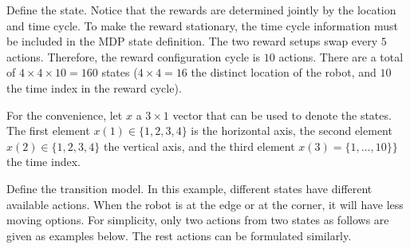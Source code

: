 Define the state. Notice that the rewards are determined jointly by the location and time cycle. To make the reward stationary, the time cycle information must be included in the MDP state definition. The two reward setups swap every $5$ actions. Therefore, the reward configuration cycle is $10$ actions. There are a total of $4\times 4\times 10=160$ states ($4\times 4=16$ the distinct location of the robot, and $10$ the time index in the reward cycle).

For the convenience, let $x$ a $3\times 1$ vector that can be used to denote the states. The first element $x(1)\in \{1,2,3,4\}$ is the horizontal axis, the second element $x(2)\in \{1,2,3,4\}$ the vertical axis, and the third element $x(3) = \{1,\ldots,10\}\}$ the time index.

Define the transition model. In this example, different states have different available actions. When the robot is at the edge or at the corner, it will have less moving options. For simplicity, only two actions from two states as follows are given as examples below. The rest actions can be formulated similarly.

